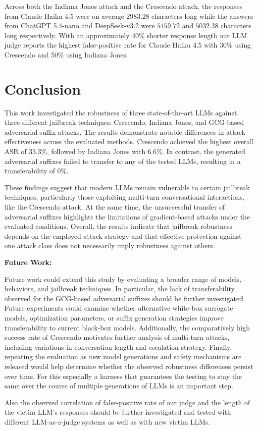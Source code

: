 \documentclass[11pt,a4paper,twocolumn]{article}
\begin{document}
	Across both the Indiana Jones attack and the Crescendo attack, the responses from Claude Haiku 4.5 were on average $2983.28$ characters long while the answers from ChatGPT 5.4-nano and DeepSeek-v3.2 were $5159.72$ and $5032.38$ characters long respectively.
	With an approximately 40\% shorter response length our LLM judge reports the highest false-positive rate for Claude Haiku 4.5 with 30\% using Crescendo and 50\% using Indiana Jones.
	
	\section{Conclusion}
	
	This work investigated the robustness of three state-of-the-art LLMs against three different jailbreak techniques: Crescendo, Indiana Jones, and GCG-based adversarial suffix attacks.
	The results demonstrate notable differences in attack effectiveness across the evaluated methods.
	Crescendo achieved the highest overall ASR of 33.3\%, followed by Indiana Jones with 6.6\%.
	In contrast, the generated adversarial suffixes failed to transfer to any of the tested LLMs, resulting in a transferability of 0\%.
	
	These findings suggest that modern LLMs remain vulnerable to certain jailbreak techniques, particularly those exploiting multi-turn conversational interactions, like the Crescendo attack.
	At the same time, the unsuccessful transfer of adversarial suffixes highlights the limitations of gradient-based attacks under the evaluated conditions.
	Overall, the results indicate that jailbreak robustness depends on the employed attack strategy and that effective protection against one attack class does not necessarily imply robustness against others.
	
	\bigskip
	
	\textbf{Future Work:}
	
	\bigskip
	
	Future work could extend this study by evaluating a broader range of models, behaviors, and jailbreak techniques.
	In particular, the lack of transferability observed for the GCG-based adversarial suffixes should be further investigated.
	Future experiments could examine whether alternative white-box surrogate models, optimization parameters, or suffix generation strategies improve transferability to current black-box models.
	Additionally, the comparatively high success rate of Crescendo motivates further analysis of multi-turn attacks, including variations in conversation length and escalation strategy.
	Finally, repeating the evaluation as new model generations and safety mechanisms are released would help determine whether the observed robustness differences persist over time.
	For this especially a harness that guarantees the testing to stay the same over the course of multiple generations of LLMs is an important step.
	
	Also the observed correlation of false-positive rate of our judge and the length of the victim LLM's responses should be further investigated and tested with different LLM-as-a-judge systems as well as with new victim LLMs.
	
	\printbibliography
	
\end{document}
